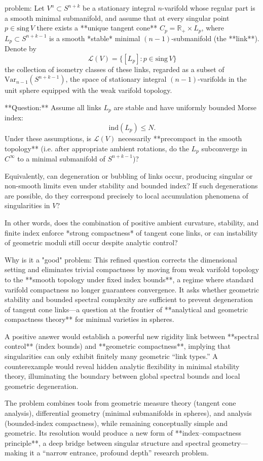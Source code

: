 problem:  
Let \(V^n \subset S^{n+k}\) be a stationary integral \(n\)-varifold whose regular part is a smooth minimal submanifold, and assume that at every singular point \(p \in \mathrm{sing}\,V\) there exists a **unique tangent cone** \(C_p = \mathbb{R}_+ \times L_p\), where \(L_p \subset S^{n+k-1}\) is a smooth *stable* minimal \((n-1)\)-submanifold (the **link**).  
Denote by  
\[
\mathcal{L}(V) = \{ [L_p] : p \in \mathrm{sing}\,V \}
\]
the collection of isometry classes of these links, regarded as a subset of \(\mathrm{Var}_{n-1}(S^{n+k-1})\), the space of stationary integral \((n-1)\)-varifolds in the unit sphere equipped with the weak varifold topology.

**Question:**  
Assume all links \(L_p\) are stable and have uniformly bounded Morse index:
\[
\mathrm{ind}(L_p) \le N.
\]
Under these assumptions, is \(\mathcal{L}(V)\) necessarily **precompact in the smooth topology** (i.e. after appropriate ambient rotations, do the \(L_p\) subconverge in \(C^\infty\) to a minimal submanifold of \(S^{n+k-1}\))?  

Equivalently, can degeneration or bubbling of links occur, producing singular or non-smooth limits even under stability and bounded index?  
If such degenerations are possible, do they correspond precisely to local accumulation phenomena of singularities in \(V\)?  

In other words, does the combination of positive ambient curvature, stability, and finite index enforce *strong compactness* of tangent cone links, or can instability of geometric moduli still occur despite analytic control?

Why is it a "good" problem:  
This refined question corrects the dimensional setting and eliminates trivial compactness by moving from weak varifold topology to the **smooth topology under fixed index bounds**, a regime where standard varifold compactness no longer guarantees convergence. It asks whether geometric stability and bounded spectral complexity are sufficient to prevent degeneration of tangent cone links—a question at the frontier of **analytical and geometric compactness theory** for minimal varieties in spheres.

A positive answer would establish a powerful new rigidity link between **spectral control** (index bounds) and **geometric compactness**, implying that singularities can only exhibit finitely many geometric “link types.” A counterexample would reveal hidden analytic flexibility in minimal stability theory, illuminating the boundary between global spectral bounds and local geometric degeneration.

The problem combines tools from geometric measure theory (tangent cone analysis), differential geometry (minimal submanifolds in spheres), and analysis (bounded-index compactness), while remaining conceptually simple and geometric. Its resolution would produce a new form of **index–compactness principle**, a deep bridge between singular structure and spectral geometry—making it a “narrow entrance, profound depth” research problem.